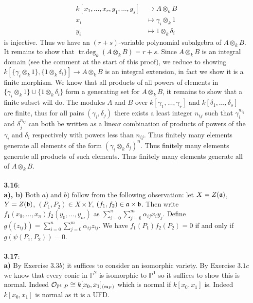\documentclass[12pt]{article}
\numberwithin{thm}{subsection}
\numberwithin{defn}{subsection}
\numberwithin{lemma}{subsection}
\numberwithin{example}{subsection}
\numberwithin{notation}{subsection}
\numberwithin{cor}{subsection}
\numberwithin{remark}{subsection}
\numberwithin{condition}{subsection}
\numberwithin{question}{subsection}
\numberwithin{construction}{subsection}
\numberwithin{construction}{subsection}
\numberwithin{construction}{subsection}
\newcommand{\bb}[1]{\mathbb{#1}}
\newcommand{\call}[1]{\mathcal{#1}}
\newcommand{\lto}{\longrightarrow}
\begin{document}
\begin{align*}
    k[x_1,...,x_r,y_1,...,y_s] &\lto A\otimes_k B\\
    x_i &\mapsto \gamma_i \otimes_k 1\\
    y_i &\mapsto 1 \otimes_k \delta_i
\end{align*}
is injective. Thus we have an $(r + s)$-variable polynomial subalgebra of $A\otimes_k B$. It remains to show that $\operatorname{tr.deg}_k(A\otimes_kB) = r + s$. Since $A\otimes_k B$ is an integral domain (see the comment at the start of this proof), we reduce to showing $k[\lbrace \gamma_i \otimes_k 1\rbrace, \lbrace 1 \otimes_k \delta_i\rbrace]\lto A\otimes_k B$ is an integral extension, in fact we show it is a finite morphism. We know that all products of all powers of elements in $\lbrace \gamma_i \otimes_k 1\rbrace \cup \lbrace 1 \otimes_k \delta_i\rbrace$ form a generating set for $A\otimes_k B$, it remains to show that a finite subset will do. The modules $A$ and $B$ over $k[\gamma_1,...,\gamma_r]$ and $k[\delta_1,...,\delta_s]$ are finite, thus for all pairs $(\gamma_i, \delta_j)$ there exists a least integer $n_{ij}$ such that $\gamma_i^{n_{ij}}$ and $\delta_j^{n_{ij}}$ can both be written as a linear combination of products of powers of the $\gamma_i$ and $\delta_i$ respectively with powers less than $n_{ij}$. Thus finitely many elements generate all elements of the form $(\gamma_i \otimes_k \delta_j)^n$. Thus finitely many elements generate all products of such elements. Thus finitely many elements generate all of $A \otimes_k B$.\\\\
%
\textbf{3.16}:\\
%
\textbf{a), b)} Both $a)$ and $b)$ follow from the following observation: let $X = Z(\frak{a})$, $Y = Z(\frak{b})$, $(P_1,P_2) \in X \times Y$, $(f_1, f_2) \in \frak{a} \times \frak{b}$. Then write $f_1(x_0,...,x_n)f_2(y_0,...,y_m)$ as $\sum_{i = 0}^n\sum_{j = 0}^m \alpha_{ij}x_iy_j$. Define $g(\lbrace z_{ij}\rbrace) = \sum_{i = 0}^n\sum_{j = 0}^m \alpha_{ij}z_{ij}$. We have $f_1(P_1)f_2(P_2) = 0$ if and only if $g(\psi(P_1,P_2)) = 0$.\\\\
%
\textbf{3.17}:\\
\textbf{a)} By Exercise $3.3b)$ it suffices to consider an isomorphic variety. By Exercise $3.1c$ we know that every conic in $\bb{P}^2$ is isomorphic to $\bb{P}^1$ so it suffices to show this is normal. Indeed $\call{O}_{\bb{P}^1,P} \cong k[x_0,x_1]_{(\frak{m}_P)}$ which is normal if $k[x_0,x_1]$ is. Indeed $k[x_0,x_1]$ is normal as it is a UFD.\\\\
\end{document}
